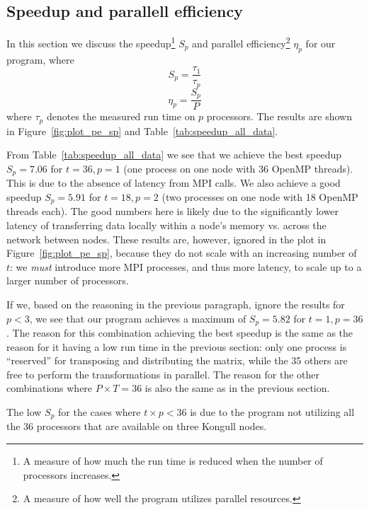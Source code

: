 
\subsection{Speedup and parallell efficiency} %
\label{sub:speedup_and_parallell_efficiency}
In this section we discuss the speedup\footnote{A measure of how much the run time is reduced when the number of processors increases.} $S_p$  and parallel efficiency\footnote{A measure of how well the program utilizes parallel resources.} $\eta_p$ for our program, where
\begin{equation}
  S_p = \frac{\tau_1}{\tau_p}
\end{equation}
\begin{equation}
  \eta_p = \frac{S_p}{P}
\end{equation}
where $\tau_p$ denotes the measured run time on $p$ processors. The results are shown in Figure~\ref{fig:plot_pe_sp} and Table~\ref{tab:speedup_all_data}.

From Table~\ref{tab:speedup_all_data} we see that we achieve the best speedup $S_p=7.06$ for $t=36, p=1$ (one process on one node with 36 OpenMP threads). This is due to the absence of latency from MPI calls. We also achieve a good speedup $S_p=5.91$ for $t=18, p=2$ (two processes on one node with 18 OpenMP threads each). The good numbers here is likely due to the significantly lower latency of transferring data locally within a node's memory vs. across the network between nodes. These results are, however, ignored in the plot in Figure~\ref{fig:plot_pe_sp}, because they do not scale with an increasing number of $t$: we \emph{must} introduce more MPI processes, and thus more latency, to scale up to a larger number of processors.

If we, based on the reasoning in the previous paragraph, ignore the results for $p<3$,  we see that our program achieves a maximum of $S_p = 5.82$ for $t=1, p=36$. The reason for this  combination achieving the best speedup is the same as the reason for it having a low run time in the previous section: only one process is ``reserved'' for transposing and distributing the matrix, while the 35 others are free to perform the transformations in parallel. The reason for the other combinations where $P\times T = 36$ is also the same as in the previous section.

The low $S_p$ for the cases where $t\times p < 36$ is due to the program not utilizing all the 36 processors that are available on three Kongull nodes.

